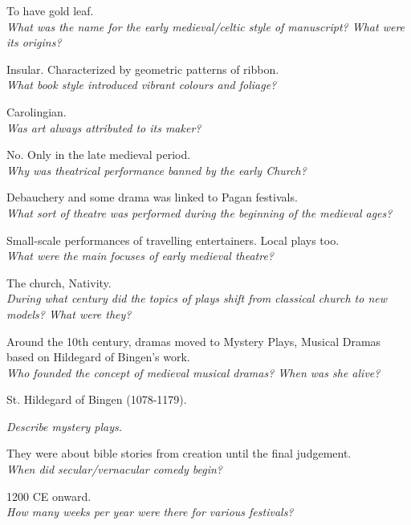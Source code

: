 \documentclass[12pt]{article}
\begin{document}
To have gold leaf.\\

\textit{What was the name for the early medieval/celtic style of manuscript? What were its origins?}

Insular. Characterized by geometric patterns of ribbon.\\

\textit{What book style introduced vibrant colours and foliage?}

Carolingian.\\

\textit{Was art always attributed to its maker?}

No. Only in the late medieval period.\\

\textit{Why was theatrical performance banned by the early Church?}

Debauchery and some drama was linked to Pagan festivals. \\

\textit{What sort of theatre was performed during the beginning of the medieval ages?}

Small-scale performances of travelling entertainers. Local plays too.\\

\textit{What were the main focuses of early medieval theatre?}

The church, Nativity.\\

\textit{During what century did the topics of plays shift from classical church to new models? What were they?}

Around the 10th century, dramas moved to Mystery Plays, Musical Dramas based on Hildegard of Bingen's work.\\

\textit{Who founded the concept of medieval musical dramas? When was she alive?}

St. Hildegard of Bingen (1078-1179).


\textit{Describe mystery plays.}

They were about bible stories from creation until the final judgement.\\

\textit{When did secular/vernacular comedy begin?}

1200 CE onward.\\

\textit{How many weeks per year were there for various festivals?}
\end{document}
